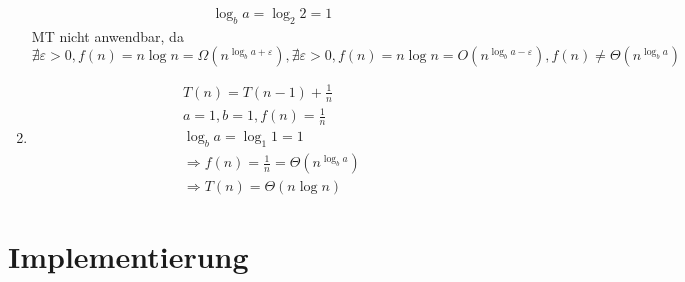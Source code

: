 \documentclass[a4paper,10pt]{scrartcl}
\begin{document}
\begin{enumerate}
\begin{align}
	\log _b a = \log _2 2 = 1
	\end{align}
	MT nicht anwendbar, da $\nexists \varepsilon > 0, f(n) = n \log
	n = \Omega(n^{\log _b a+\varepsilon}), \nexists \varepsilon > 0,
	f(n) = n \log n = O(n^{\log _b a-\varepsilon}), f(n) \neq
	\Theta(n^{\log _b a})$
\item	\begin{align}
	T(n) = T(n-1) + \frac{1}{n} \\
	a = 1, b = 1, f(n) = \frac{1}{n} \\
	\log _b a = \log _1 1 = 1 \\
	\Rightarrow f(n) = \frac{1}{n} = \Theta(n^{\log _b a}) \\
	\Rightarrow T(n) = \Theta(n \log n) \tag{Fall 2 des Master-Theorems}
	\end{align}
\end{enumerate}

\section{Implementierung}
\end{document}
